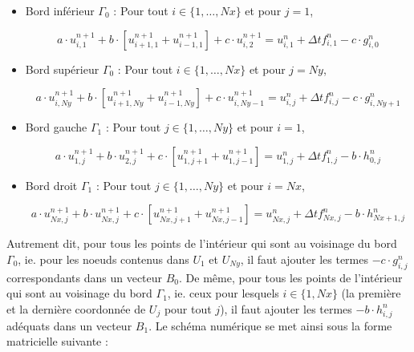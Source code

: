 \documentclass[11pt]{article}
\begin{document}
\noindent
\begin{itemize}
	\item Bord inférieur $\Gamma_0$ : Pour tout $i \in \{1, \ldots, Nx \}$ et pour $j = 1$,

$$a \cdot u^{n+1}_{i,1} + b \cdot [u^{n+1}_{i+1,1} + u^{n+1}_{i-1,1}] + c \cdot u^{n+1}_{i,2} = u^n_{i,1} + \Delta t f^n_{i,1} - c \cdot g^n_{i,0}$$

\vspace{5 mm}

\noindent
	\item Bord supérieur $\Gamma_0$ : Pour tout $i \in \{1, \ldots, Nx \}$ et pour $j = Ny$,

$$a \cdot u^{n+1}_{i,Ny} + b \cdot [u^{n+1}_{i+1,Ny} + u^{n+1}_{i-1,Ny}] + c \cdot u^{n+1}_{i,Ny-1} = u^n_{i,j} + \Delta t f^n_{i,j} - c \cdot g^n_{i,Ny+1}$$

\vspace{5 mm}

\noindent
	\item Bord gauche $\Gamma_1$ : Pour tout $j \in \{1, \ldots, Ny \}$ et pour $i = 1$,

$$a \cdot u^{n+1}_{1,j} + b \cdot u^{n+1}_{2,j} + c \cdot [u^{n+1}_{1,j+1} + u^{n+1}_{1,j-1}] = u^n_{1,j} + \Delta t f^n_{1,j} - b \cdot h^n_{0,j}$$

\vspace{5 mm}

\noindent
	\item Bord droit $\Gamma_1$ : Pour tout $j \in \{1, \ldots, Ny \}$ et pour $i = Nx$,

$$a \cdot u^{n+1}_{Nx,j} + b \cdot u^{n+1}_{Nx,j} + c \cdot [u^{n+1}_{Nx,j+1} + u^{n+1}_{Nx,j-1}] = u^n_{Nx,j} + \Delta t f^n_{Nx,j} - b \cdot h^n_{Nx+1,j}$$

\end{itemize}

\vspace{5 mm}

\noindent
Autrement dit, pour tous les points de l'intérieur qui sont au voisinage du bord $\Gamma_0$, ie. pour les noeuds contenus dans $U_1$ et $U_{Ny}$, il faut ajouter les termes $- c \cdot g^n_{i,j}$ correspondants dans un vecteur $B_0$. De même, pour tous les points de l'intérieur qui sont au voisinage du bord $\Gamma_1$, ie. ceux pour lesquels $i \in \{1, Nx \}$ (la première et la dernière coordonnée de $U_j$ pour tout $j$), il faut ajouter les termes $- b \cdot h^n_{i,j}$ adéquats dans un vecteur $B_1$. Le schéma numérique se met ainsi sous la forme matricielle suivante :
\end{document}
